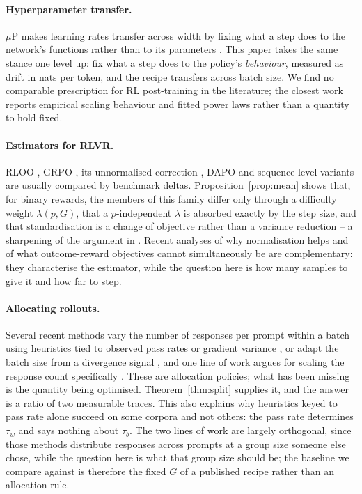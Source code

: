 \paragraph{Hyperparameter transfer.} $\mu$P makes learning rates transfer across width by fixing what
a step does to the network's functions rather than to its parameters
\citep{yang2021tensor, yang2022mutransfer}. This paper takes the same stance one level up: fix what
a step does to the policy's \emph{behaviour}, measured as drift in nats per token, and the recipe
transfers across batch size. We find no comparable prescription for RL post-training in the
literature; the closest work reports empirical scaling behaviour and fitted power laws
\citep{tan2025scalingbehaviors, khatri2025artofscaling, ghosh2026predictable} rather than a
quantity to hold fixed.

\paragraph{Estimators for RLVR.} RLOO \citep{ahmadian2024rloo, williams1992reinforce}, GRPO
\citep{shao2024deepseekmath}, its unnormalised correction \citep{liu2025drgrpo}, DAPO
\citep{yu2025dapo} and sequence-level variants \citep{zheng2025gspo} are usually compared by
benchmark deltas. Proposition~\ref{prop:mean} shows that, for binary rewards, the members of this
family differ only through a difficulty weight $\lambda(p, G)$, that a $p$-independent $\lambda$ is
absorbed exactly by the step size, and that standardisation is a change of objective rather than a
variance reduction -- a sharpening of the argument in \citet{liu2025drgrpo}. Recent analyses of why
normalisation helps \citep{ge2026normalization} and of what outcome-reward objectives cannot
simultaneously be \citep{ding2026impossibility} are complementary: they characterise the estimator,
while the question here is how many samples to give it and how far to step.

\paragraph{Allocating rollouts.} Several recent methods vary the number of responses per prompt
within a batch using heuristics tied to observed pass rates or gradient variance
\citep{nguyen2026allocation}, or adapt the batch size from a divergence signal
\citep{park2026batchscaling}, and one line of work argues for scaling the response count
specifically \citep{hu2025brorl}. These are allocation policies; what has been missing is the
quantity being optimised. Theorem~\ref{thm:split} supplies it, and the answer is a ratio of two measurable traces. This
also explains why heuristics keyed to pass rate alone succeed on some corpora and not others:
the pass rate determines $\tau_w$ and says nothing about $\tau_b$. The two lines of work are
largely orthogonal, since those methods distribute responses across prompts at a group size
someone else chose, while the question here is what that group size should be; the baseline we
compare against is therefore the fixed $G$ of a published recipe rather than an allocation rule.

